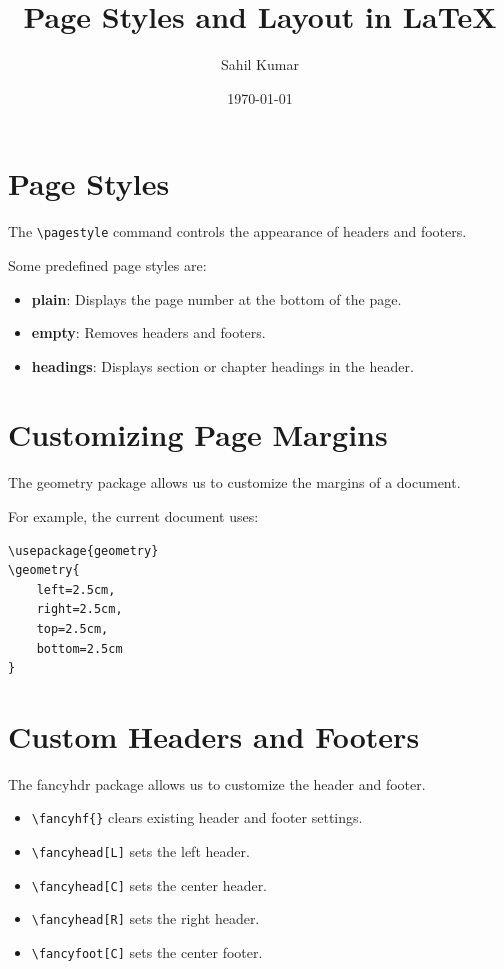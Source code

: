 \documentclass[12pt,a4paper]{article}
\title{Page Styles and Layout in LaTeX}
\author{Sahil Kumar}
\date{\today}
\begin{document}
\maketitle

\section{Page Styles}

The \texttt{\textbackslash pagestyle} command
controls the appearance of headers and footers.

Some predefined page styles are:

\begin{itemize}
    \item \textbf{plain}: Displays the page number
    at the bottom of the page.

    \item \textbf{empty}: Removes headers and footers.

    \item \textbf{headings}: Displays section or
    chapter headings in the header.
\end{itemize}

\section{Customizing Page Margins}

The geometry package allows us to customize
the margins of a document.

For example, the current document uses:

\begin{verbatim}
\usepackage{geometry}
\geometry{
    left=2.5cm,
    right=2.5cm,
    top=2.5cm,
    bottom=2.5cm
}
\end{verbatim}

\section{Custom Headers and Footers}

The fancyhdr package allows us to customize
the header and footer.

\begin{itemize}
    \item \texttt{\textbackslash fancyhf\{\}} clears
    existing header and footer settings.

    \item \texttt{\textbackslash fancyhead[L]}
    sets the left header.

    \item \texttt{\textbackslash fancyhead[C]}
    sets the center header.

    \item \texttt{\textbackslash fancyhead[R]}
    sets the right header.

    \item \texttt{\textbackslash fancyfoot[C]}
    sets the center footer.
\end{itemize}
\end{document}
